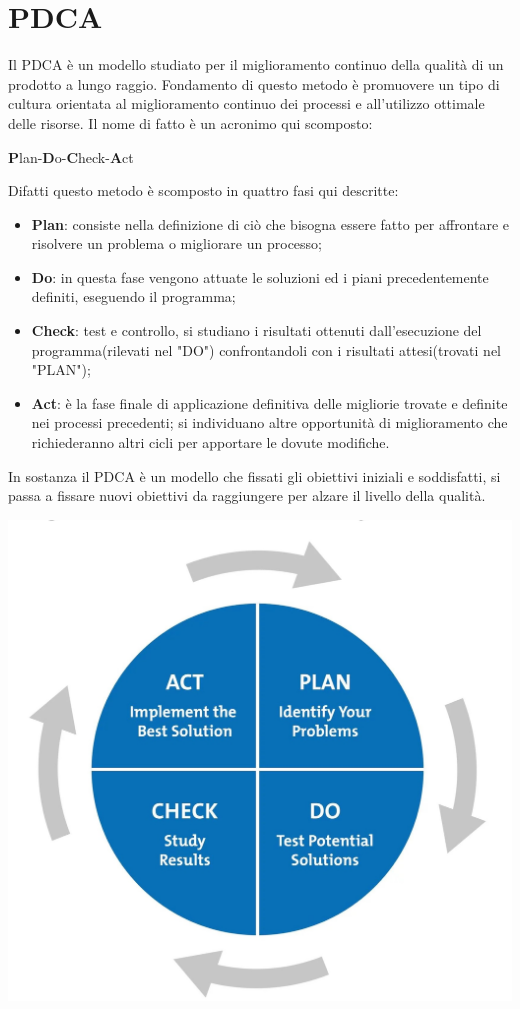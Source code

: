 \section{PDCA}
\label{pdca}
Il PDCA è un modello studiato per il miglioramento continuo della qualità di un prodotto a lungo raggio. Fondamento di questo metodo è promuovere un tipo di cultura orientata al miglioramento continuo dei processi e all'utilizzo ottimale delle risorse. Il nome di fatto è un acronimo qui scomposto:
\begin{center}
	\item \textbf{P}lan-\textbf{D}o-\textbf{C}heck-\textbf{A}ct
\end{center}
Difatti questo metodo è scomposto in quattro fasi qui descritte:
\begin{itemize}
	\item \textbf{Plan}: consiste nella definizione di ciò che bisogna essere fatto per affrontare e risolvere un problema o migliorare un processo;
	\item \textbf{Do}: in questa fase vengono attuate le soluzioni ed i piani precedentemente definiti, eseguendo il programma;
	\item \textbf{Check}: test e controllo, si studiano i risultati ottenuti dall'esecuzione del programma(rilevati nel "DO") confrontandoli con i risultati attesi(trovati nel "PLAN"); 
	\item \textbf{Act}: è la fase finale di applicazione definitiva delle migliorie trovate e definite nei processi precedenti; si individuano altre opportunità di miglioramento che richiederanno altri cicli per apportare le dovute modifiche.
\end{itemize}
In sostanza il PDCA è un modello che fissati gli obiettivi iniziali e soddisfatti, si passa a fissare nuovi obiettivi da raggiungere per alzare il livello della qualità.
\begin{center}
\item \includegraphics[scale=0.3]{./images/pdca.jpg} 
\end{center}
 